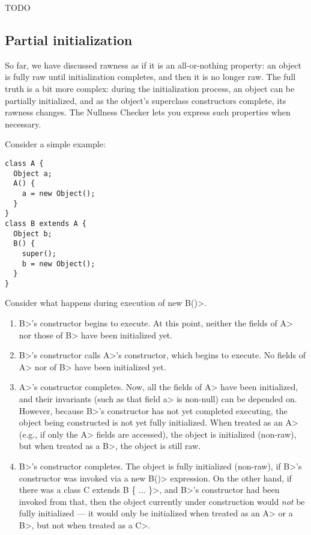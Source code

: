 
\iffalse TODO
\subsection{Partial initialization\label{partial-initialization}}

So far, we have discussed rawness as if it is an all-or-nothing property:
an object is fully raw until initialization completes, and then it is no
longer raw.  The full truth is a bit more complex:  during the
initialization process, an object can be partially initialized, and as the
object's superclass constructors complete, its rawness changes.  The
Nullness Checker lets you express such properties when necessary.

Consider a simple example:

\begin{Verbatim}
class A {
  Object a;
  A() {
    a = new Object();
  }
}
class B extends A {
  Object b;
  B() {
    super();
    b = new Object();
  }
}
\end{Verbatim}

Consider what happens during execution of \<new B()>.

\begin{enumerate}
\item \<B>'s constructor begins to execute.  At this point, neither the
  fields of \<A> nor those of \<B> have been initialized yet.
\item \<B>'s constructor calls \<A>'s constructor, which begins to execute.
  No fields of \<A> nor of \<B> have been initialized yet.
\item \<A>'s constructor completes.  Now, all the fields of \<A> have been
  initialized, and their invariants (such as that field \<a> is non-null) can be
  depended on.  However, because \<B>'s constructor has not yet completed
  executing, the object being constructed is not yet fully initialized.
  When treated as an \<A> (e.g., if only the \<A> fields are accessed), the
  object is initialized (non-raw), but when treated as a \<B>, the object
  is still raw.
\item \<B>'s constructor completes.  The object is fully initialized
  (non-raw), if \<B>'s constructor was invoked via a \<new B()>
  expression.  On the other hand, if there was a \<class C extends B \{
  ... \}>, and \<B>'s constructor had been invoked from that, then the
  object currently under construction would \emph{not} be fully initialized
  --- it would only be initialized when treated as an \<A> or a \<B>, but
  not when treated as a \<C>.
\end{enumerate}


